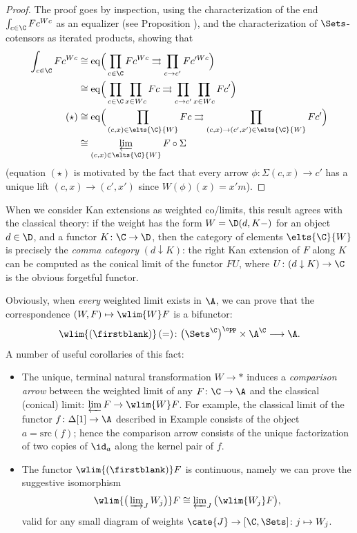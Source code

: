 \begin{proof}
The proof goes by inspection, using the characterization of the end $\int_{c\in \C}Fc^{Wc} $ as an equalizer (see Proposition ), and the characterization of $\Sets$-cotensors as iterated products, showing that 
\begin{align*}
\int_{c\in \C}Fc^{Wc} &\cong {\rm eq}\Big(  \prod_{c\in \C}Fc^{Wc}\rightrightarrows \prod_{c\to c'}Fc'^{Wc}\Big)\\
&\cong {\rm eq}\Big( \prod_{c\in\C}\prod_{x\in Wc} Fc\rightrightarrows \prod_{c\to c'}\prod_{x\in Wc}Fc' \Big)\\
(\star) &\cong {\rm eq}\Big( \prod_{(c,x)\in \elts{\C}{W}} Fc\rightrightarrows \prod_{(c,x)\to (c',x')\in \elts{\C}{W}} Fc' \Big)\\
&\cong \varprojlim_{(c,x)\in\elts{\C}{W}} F\circ \Sigma 
\end{align*}
(equation $(\star)$ is motivated by the fact that every arrow $\phi \colon \Sigma(c,x)\to c'$ has a unique lift $(c,x)\to (c', x')$ since $W(\phi)(x) = x'm$).
\end{proof}
\begin{remark}
When we consider Kan extensions as weighted co/limits, this result agrees with the classical theory: if the weight has the form $W=\D(d,K-)$ for an object $d\in\D$, and a functor $K\colon \C\to\D$, then the category of elements $\elts{\C}{W}$ is precisely the \emph{comma category} $(d\downarrow K)$: the right Kan extension of $F$ along $K$ can be computed as the conical limit of the functor $FU$, where $U\colon (d\downarrow K)\to \C$ is the obvious forgetful functor.
\end{remark}
Obviously, when \emph{every} weighted limit exists in $\A$, we can prove that the correspondence $(W,F) \mapsto\wlim{W}F$ is a bifunctor:
\[
\wlim{(\firstblank)}\,(=)\colon \big(\Sets^\C \big)^\opp\times \A^\C\longrightarrow \A.
\] A number of useful corollaries of this fact:
\begin{itemize}
\item The unique, terminal natural transformation $W\to *$ induces a \emph{comparison arrow} between the weighted limit of any $F\colon\C\to\A$ and the classical (conical) limit: $\varprojlim F\to \wlim{W}F$. For example, the classical limit of the functor $f\colon \Delta[1]\to \A$ described in Example  consists of the object $a = \text{src}(f)$; hence the comparison arrow consists of the unique factorization of two copies of $\id_a$ along the kernel pair of $f$.
\item The functor $\wlim{(\firstblank)}F$ is continuous, namely we can prove the suggestive isomorphism
\[\textstyle\label{wlimcocont} 
\wlim{\big(\varinjlim_J W_j\big)}F\cong \varprojlim_J \big(\wlim{W_j}F\big),
\]
valid for any small diagram of weights $\cate{J}\to [\C, \Sets]\colon j\mapsto W_j$.
\end{itemize}
